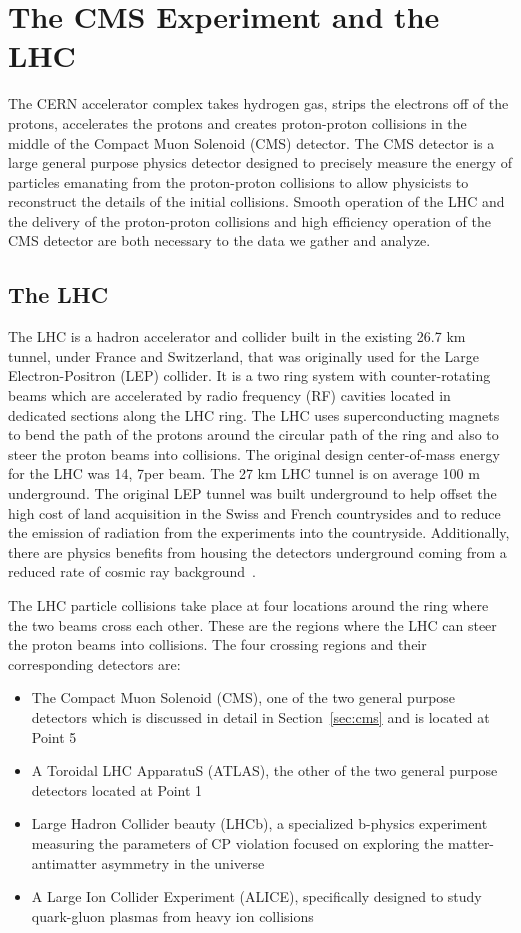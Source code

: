 \chapter{The CMS Experiment and the LHC}
\label{sec:cms_lhc}
The CERN accelerator complex takes hydrogen gas, strips the electrons off of the protons,
accelerates the protons and creates proton-proton collisions in the middle of the
Compact Muon Solenoid (CMS) detector. The CMS detector is a large general purpose 
physics detector designed to precisely measure the energy of particles
emanating from the proton-proton collisions to allow physicists to reconstruct
the details of the initial collisions. Smooth operation of the LHC and the delivery
of the proton-proton collisions and high efficiency operation of the CMS detector
are both necessary to the data we gather and analyze.


\section{The LHC}
The LHC is a hadron accelerator and collider built in the existing 26.7 km tunnel,
under France and Switzerland, that was originally used for the Large Electron-Positron (LEP)
collider. It is a two ring system with counter-rotating beams which are accelerated by
radio frequency (RF) cavities located in dedicated sections along the LHC ring. 
The LHC uses superconducting magnets to 
bend the path of the protons around the circular path of the ring and also to steer
the proton beams into collisions. The original design center-of-mass energy for the LHC
was 14\TeV, 7\TeV per beam. The 27 km LHC tunnel is on average 100 m underground.
The original LEP tunnel was built underground to help offset the high cost of land
acquisition in the Swiss and French countrysides and to reduce the emission of radiation
from the experiments into the countryside. Additionally, there are physics
benefits from housing the detectors underground coming from a reduced rate of cosmic
ray background~\cite{Voss:2009zz}.

The LHC particle collisions take place at four locations around the ring where the two beams
cross each other. These are the regions where the LHC can steer the proton
beams into collisions. The four crossing regions and their corresponding detectors are:
\begin{itemize}
\item The Compact Muon Solenoid (CMS), one of the two general purpose detectors which is
discussed in detail in Section~\ref{sec:cms} and is located at Point 5
\item A Toroidal LHC ApparatuS (ATLAS), the other of the two general purpose detectors
located at Point 1
\item Large Hadron Collider beauty (LHCb), a specialized b-physics experiment measuring
the parameters of CP violation focused on exploring the matter-antimatter asymmetry
in the universe
\item A Large Ion Collider Experiment (ALICE), specifically designed to study
quark-gluon plasmas from heavy ion collisions
\end{itemize}

